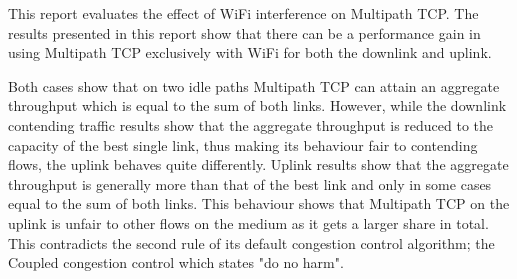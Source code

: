 This report evaluates the effect of WiFi interference on Multipath TCP. 
The results presented in this report show that there can be a performance gain 
in using Multipath TCP exclusively with WiFi for both the downlink and uplink.

Both cases show that on two idle paths Multipath TCP can attain an aggregate
throughput which is equal to the sum of both links. 
However, while the downlink contending traffic results show that the aggregate 
throughput is reduced to the capacity of the best single link, thus making its 
behaviour fair to contending flows, the uplink behaves quite differently.
Uplink results show that the aggregate throughput is generally more than that of 
the best link and only in some cases equal to the sum of both links. This 
behaviour shows that Multipath TCP on the uplink is unfair to other flows on the 
medium as it gets a larger share in total. This contradicts the second rule of 
its default congestion control algorithm; the Coupled congestion control which 
states "do no harm".
